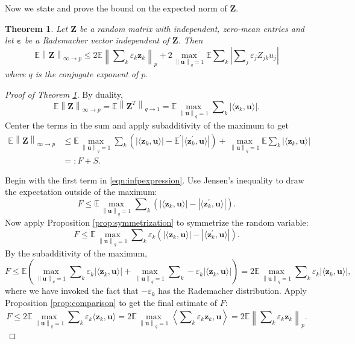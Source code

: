 \documentclass[11pt,letterpaper,twoside,reqno]{amsart}
\newcommand{\mat}[1]{\ensuremath{\bm{#1}}}
\newcommand{\E}{\ensuremath{\mathbb{E}}}
\newcommand{\supoverqball}{\ensuremath{\max_{\qnorm{\mat{u}} = 1}}}
\newcommand{\norm}[1]{\ensuremath{\left\|#1\right\|}}
\newcommand{\pnorm}[1]{\ensuremath{\left\|#1\right\|_p}}
\newcommand{\qnorm}[1]{\ensuremath{\left\|#1\right\|_q}}
\newcommand{\eqqcolon}{=\mathrel{\mathop:}} %
\newtheorem{thm}{Theorem}
\begin{document}
Now we state and prove the bound on the expected norm of $\mat{Z}$.
\begin{thm}
Let $\mat{Z}$ be a random matrix with independent, zero-mean entries and let $\boldsymbol{\varepsilon}$ be a Rademacher vector independent of $\mat{Z}$. Then
\[
\E\norm{\mat{Z}}_{\infty\rightarrow p} \leq 2\E\pnorm{\sum\nolimits_k \varepsilon_k \mat{z}_k} + 2 \supoverqball \E\sum\nolimits_k \left|\sum\nolimits_j \varepsilon_j Z_{jk} u_j \right|
\]
where $q$ is the conjugate exponent of $p$.
\label{thm:inftopbound}
\end{thm}

\begin{proof}[Proof of Theorem \ref{thm:inftopbound}] 
By duality, 
\[
\E\norm{\mat{Z}}_{\infty\rightarrow p}=\E\norm{\mat{Z}^{T}}_{q\rightarrow1}=\E\supoverqball\sum\nolimits _{k}|\langle\mat{z}_{k},\mat{u}\rangle|.
\]
Center the terms in the sum and apply subadditivity of the maximum to get
\begin{equation}
\begin{aligned}
\E\norm{\mat{Z}}_{\infty\rightarrow p} & \leq\E\supoverqball\sum\nolimits_{k}(|\langle\mat{z}_{k},\mat{u}\rangle|-\E^\prime|\langle\mat{z}_{k}^\prime,\mat{u}\rangle|)+\supoverqball\E\sum\nolimits_{k}|\langle\mat{z}_{k},\mat{u}\rangle| \\
	& \eqqcolon F+S.
\end{aligned}
\label{eqn:infpexpression}
\end{equation}

Begin with the first term in \eqref{eqn:infpexpression}. Use Jensen's inequality to draw the expectation outside of the maximum: 
\[
F\leq\E\supoverqball\sum\nolimits_{k}(|\langle\mat{z}_{k},\mat{u}\rangle|-|\langle\mat{z}_{k}^{\prime},\mat{u}\rangle|).
\]
Now apply Proposition \ref{prop:symmetrization} to symmetrize the random variable: 
\[
F\leq\E\supoverqball\sum\nolimits_{k}\varepsilon_{k}(|\langle\mat{z}_{k},\mat{u}\rangle|-|\langle\mat{z}_{k}^{\prime},\mat{u}\rangle|).
\]
By the subadditivity of the maximum, \[
F\leq\E\left(\supoverqball\sum\nolimits_{k}\varepsilon_{k}|\langle\mat{z}_{k},\mat{u}\rangle|+\supoverqball\sum\nolimits_{k}-\varepsilon_{k}|\langle\mat{z}_{k},\mat{u}\rangle|\right)=2\E\supoverqball\sum\nolimits_{k}\varepsilon_{k}|\langle\mat{z}_{k},\mat{u}\rangle|,
\]
where we have invoked the fact that $-\varepsilon_{k}$ has the Rademacher distribution. Apply Proposition \ref{prop:comparison} to get the final estimate of $F$: 
\[
F\leq2\E\supoverqball\sum\nolimits_{k}\varepsilon_{k}\langle\mat{z}_{k},\mat{u}\rangle=2\E\supoverqball\left\langle \sum\nolimits_{k}\varepsilon_{k}\mat{z}_{k},\mat{u}\right\rangle =2\E\norm{\sum\nolimits_{k}\varepsilon_{k}\mat{z}_{k}}_{p}.
\]


\end{proof}
\end{document}
